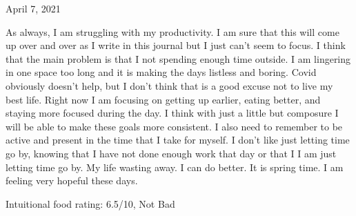 \documentclass{article}
\begin{document}
	\begin{center}
		April 7, 2021
	\end{center}

		As always, I am 
	struggling with my productivity.
	I am sure that this will come up over
	and over as I write in this journal
	but I just can't seem to focus.  I think
	that the main problem is that I not spending 
	enough time outside. I am lingering in one 
	space too long and it is making the days listless
	and boring. Covid obviously doesn't help, but I 
	don't think that is a good excuse not to live 
	my best life. Right now I am focusing on getting
	up earlier, eating better, and staying more
	focused during the day. I think with just a 
	little but composure I will be able to make these
	goals more consistent. I also need to remember to 
	be active and present in the time that I take for
	myself. I don't like just letting time go by, knowing 
	that I have not done enough work that day or that I 
	I am just letting time go by. My life wasting away.
	I can do better. It is spring time. I am feeling very 
	hopeful these days.
	
	\begin{center}
		Intuitional food rating: 6.5/10, Not Bad
	\end{center}
\end{document}
